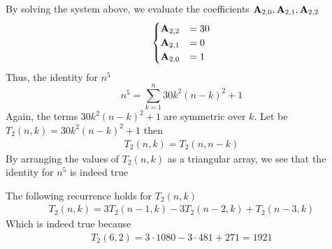 By solving the system above, we evaluate the coefficients ${\mathbf{A}} \sb{2,0}, {\mathbf{A}} \sb{2,1}, {\mathbf{A}} \sb{2,2}$
\begin{equation*}
    \begin{cases}
        {\mathbf{A}} \sb{2,2} &= 30 \\
        {\mathbf{A}} \sb{2,1} &= 0 \\
        {\mathbf{A}} \sb{2,0} &= 1
    \end{cases}
\end{equation*}
Thus, the identity for $n^5$
\begin{equation*}
    n^5 = \sum_{k=1}^{n} 30k^2(n-k)^2 + 1
\end{equation*}
Again, the terms $30k^2(n-k)^2 + 1$ are symmetric over $k$.
Let be $T_2 (n,k) = 30k^2(n-k)^2 + 1$ then
\begin{align*}
    T_2 (n,k) = T_2 (n,n-k)
\end{align*}
By arranging the values of $T_{2} (n,k)$ as a triangular array, we see that the identity for $n^5$ is indeed true

The following recurrence holds for $T_2 (n,k)$
\begin{align*}
    T_2 (n, k) = 3T_2(n-1, k) - 3T_2(n-2, k) + T_2(n-3, k)
\end{align*}
Which is indeed true because
\begin{align*}
    T_2 (6,2) = 3 \cdot 1080 - 3 \cdot 481 + 271 = 1921
\end{align*}


